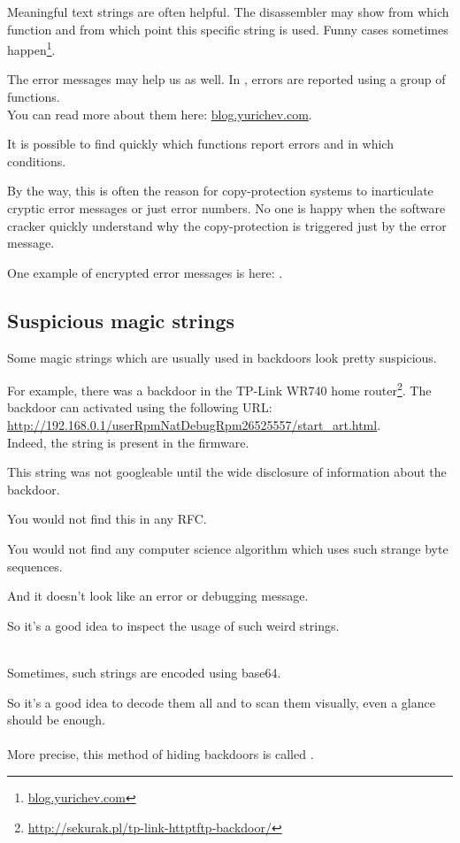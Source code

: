 Meaningful text strings are often helpful.
The \IDA disassembler may show from which function and from which point this specific string is used.
Funny cases sometimes happen\footnote{\href{http://go.yurichev.com/17223}{blog.yurichev.com}}.

The error messages may help us as well.
In \oracle, errors are reported using a group of functions.\\
You can read more about them here: \href{http://go.yurichev.com/17224}{blog.yurichev.com}.


It is possible to find quickly which functions report errors and in which conditions.

By the way, this is often the reason for copy-protection systems to inarticulate cryptic error messages 
or just error numbers. No one is happy when the software cracker quickly understand why the copy-protection
is triggered just by the error message.

One example of encrypted error messages is here: .

\subsection{Suspicious magic strings}

Some magic strings which are usually used in backdoors look pretty suspicious.

For example, there was a backdoor in the TP-Link WR740 home router\footnote{\url{http://sekurak.pl/tp-link-httptftp-backdoor/}}.
The backdoor can activated using the following URL:\\
\url{http://192.168.0.1/userRpmNatDebugRpm26525557/start_art.html}.\\

Indeed, the  string is present in the firmware.

This string was not googleable until the wide disclosure of information about the backdoor.

You would not find this in any \ac{RFC}.

You would not find any computer science algorithm which uses such strange byte sequences.

And it doesn't look like an error or debugging message.

So it's a good idea to inspect the usage of such weird strings.\\
\\

Sometimes, such strings are encoded using base64.

So it's a good idea to decode them all and to scan them visually, even a glance should be enough.\\
\\
More precise, this method of hiding backdoors is called .

